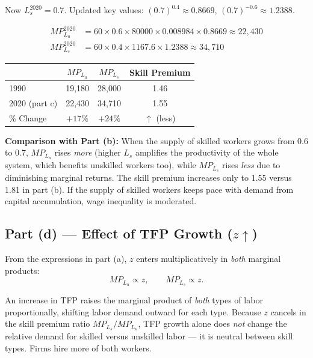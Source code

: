 \documentclass[12pt]{article}
\begin{document}
Now $L_s^{2020} = 0.7$. Updated key values:
$(0.7)^{0.4} \approx 0.8669$,\; $(0.7)^{-0.6} \approx 1.2388$.

\begin{align*}
    MP_{L_u}^{2020}
        &= 60 \times 0.6 \times 80000 \times 0.008984 \times 0.8669
         \approx 22{,}430 \\[4pt]
    MP_{L_s}^{2020}
        &= 60 \times 0.4 \times 1167.6 \times 1.2388
         \approx 34{,}710
\end{align*}

\begin{center}
\begin{tabular}{lccc}
\toprule
 & $MP_{L_u}$ & $MP_{L_s}$ & Skill Premium \\
\midrule
1990 & 19,180 & 28,000 & 1.46 \\
2020 (part c) & 22,430 & 34,710 & 1.55 \\
\% Change & $+17\%$ & $+24\%$ & $\uparrow$ (less) \\
\bottomrule
\end{tabular}
\end{center}

\textbf{Comparison with Part (b):} When the supply of skilled workers grows
from 0.6 to 0.7, $MP_{L_u}$ rises \emph{more} (higher $L_s$ amplifies the
productivity of the whole system, which benefits unskilled workers too), while
$MP_{L_s}$ rises \emph{less} due to diminishing marginal returns. The skill
premium increases only to 1.55 versus 1.81 in part (b). If the supply of
skilled workers keeps pace with demand from capital accumulation, wage
inequality is moderated.

\subsection*{Part (d) --- Effect of TFP Growth ($z \uparrow$)}

From the expressions in part (a), $z$ enters multiplicatively in \emph{both}
marginal products:
\[
    MP_{L_u} \propto z, \qquad MP_{L_s} \propto z.
\]

An increase in TFP raises the marginal product of \emph{both} types of labor
proportionally, shifting labor demand outward for each type. Because $z$
cancels in the skill premium ratio $MP_{L_s}/MP_{L_u}$, TFP growth alone does
\emph{not} change the relative demand for skilled versus unskilled labor ---
it is neutral between skill types. Firms hire more of both workers.
\end{document}
